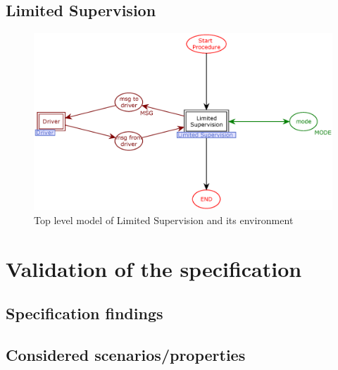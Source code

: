 \documentclass{template/openetcs_article}
\begin{document}
\subsection{Limited Supervision}

\begin{figure}[htb] 
  \centering
  \includegraphics[scale=0.5]{LimitedSuper-toplevel.eps}
  \caption{Top level model of Limited Supervision and its environment}
  \label{fig:Limitedsup-toplevel}
\end{figure}



\section{Validation of the specification}\label{s:validation}

\subsection{Specification findings}

\subsection{Considered scenarios/properties}
\end{document}
